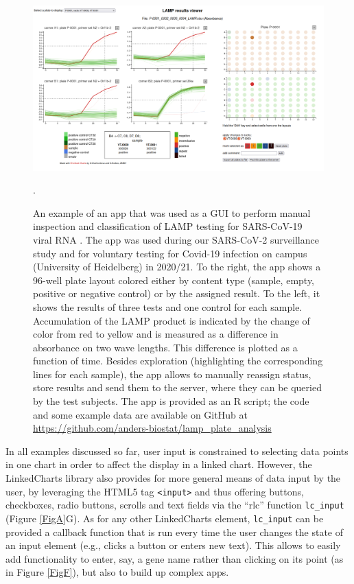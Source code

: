 \documentclass[twocolumn,10pt]{article}
\begin{document}
\begin{figure}[t]
   \includegraphics[width=\textwidth]{FigG/figG.png}
   \caption{An example of an app that was used as a GUI to perform manual inspection and classification of LAMP testing for SARS-CoV-19 viral RNA \citep{daothi_2020}. The app was used during our SARS-CoV-2 surveillance study \citep{deckert_2021} and for voluntary testing for Covid-19 infection on campus (University of Heidelberg) in 2020/21. To the right, the app shows a 96-well plate layout colored either by content type (sample, empty, positive or negative control) or by the assigned result. To the left, it shows the results of three tests and one control for each sample. Accumulation of the LAMP product is indicated by the change of color from red to yellow and is measured as a difference in absorbance on two wave lengths. This difference is plotted as a function of time. Besides exploration (highlighting the corresponding lines for each sample), the app allows to manually reassign status, store results and send them to the server, where they can be queried by the test subjects. The app is provided as an R script; the code and some example data are available on GitHub at \url{https://github.com/anders-biostat/lamp_plate_analysis}}.
   \label{lc_FigG}
\end{figure}

In all examples discussed so far, user input is constrained to selecting data points in one chart in order to affect the display in a linked chart. However, the LinkedCharts library also provides for more general means of data input by the user, by leveraging the HTML5 tag \texttt{<input>} and thus offering buttons, checkboxes, radio buttons, scrolls and text fields via the ``rlc'' function \texttt{lc_input} (Figure \ref{FigA}G). As for any other LinkedCharts element, \texttt{lc_input} can be provided a callback function that is run every time the user changes the state of an input element (e.g., clicks a button or enters new text). This allows to easily add functionality to enter, say, a gene name rather than clicking on its point (as in Figure \ref{FigF}), but also to build up complex apps.
\end{document}
